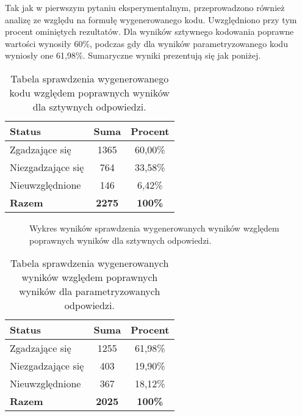 Tak jak w pierwszym pytaniu eksperymentalnym, przeprowadzono również analizę ze względu na formułę wygenerowanego kodu. Uwzględniono przy tym procent ominiętych rezultatów. Dla wyników sztywnego kodowania poprawne wartości wynosiły 60\%, podczas gdy dla wyników parametryzowanego kodu wyniosły one 61,98\%. Sumaryczne wyniki prezentują się jak poniżej.

\begin{table}[ht]
\caption{Tabela sprawdzenia wygenerowanego kodu względem poprawnych wyników dla sztywnych odpowiedzi.}\label{tab:tabela5}
\centering%
\begin{tabular}{|l|c|c|}
\hline
\textbf{Status} & \textbf{Suma} & \textbf{Procent} \\
\hline
Zgadzające się & 1365 & 60,00\% \\
\hline
Niezgadzające się & 764 & 33,58\% \\
\hline
Nieuwzględnione & 146 & 6,42\% \\
\hline
\textbf{Razem} & \textbf{2275} & \textbf{100\%} \\
\hline
\end{tabular}
\end{table}

\begin{figure}[H]
\centering
{}
\caption{Wykres wyników sprawdzenia wygenerowanych wyników względem poprawnych wyników dla sztywnych odpowiedzi.}\label{rys:plama2e}
\end{figure}

\begin{table}[ht]
\caption{Tabela sprawdzenia wygenerowanych wyników względem poprawnych wyników dla parametryzowanych odpowiedzi.}\label{tab:tabela6}
\centering%
\begin{tabular}{|l|c|c|}
\hline
\textbf{Status} & \textbf{Suma} & \textbf{Procent} \\
\hline
Zgadzające się & 1255 & 61,98\% \\
\hline
Niezgadzające się & 403 & 19,90\% \\
\hline
Nieuwzględnione & 367 & 18,12\% \\
\hline
\textbf{Razem} & \textbf{2025} & \textbf{100\%} \\
\hline
\end{tabular}
\end{table}


